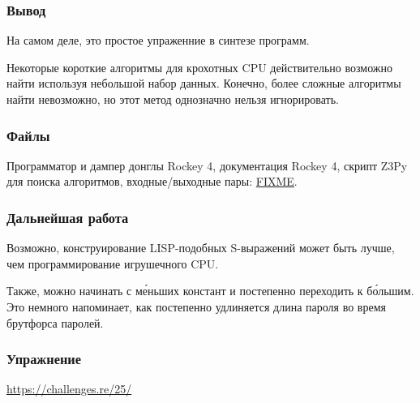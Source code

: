 \subsubsection{Вывод}

На самом деле, это простое упраженние в синтезе программ.

Некоторые короткие алгоритмы для крохотных \ac{CPU} действительно возможно найти используя небольшой набор данных.
Конечно, более сложные алгоритмы найти невозможно,
но этот метод однозначно нельзя игнорировать.

\subsubsection{Файлы}

Программатор и дампер донглы Rockey 4, документация Rockey 4, скрипт Z3Py для поиска алгоритмов, входные/выходные пары:
\url{FIXME}.

\subsubsection{Дальнейшая работа}

Возможно, конструирование LISP-подобных S-выражений может быть лучше, чем программирование игрушечного CPU.

Также, можно начинать с м\'{е}ньших констант и постепенно переходить к б\'{о}льшим.
Это немного напоминает, как постепенно удлиняется длина пароля во время брутфорса паролей.

\subsubsection{Упражнение}

\url{https://challenges.re/25/}

